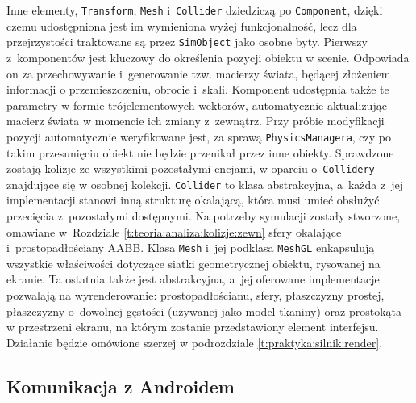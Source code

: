 		Inne elementy, \texttt{Transform}, \texttt{Mesh} i~\texttt{Collider} dziedziczą po \texttt{Component}, dzięki czemu udostępniona jest im wymieniona wyżej funkcjonalność, lecz dla przejrzystości traktowane są przez \texttt{SimObject} jako osobne byty. Pierwszy z~komponentów jest kluczowy do określenia pozycji obiektu w scenie. Odpowiada on za przechowywanie i~generowanie tzw. macierzy świata, będącej złożeniem informacji o przemieszczeniu, obrocie i~skali. Komponent udostępnia także te parametry w formie trójelementowych wektorów, automatycznie aktualizując macierz świata w momencie ich zmiany z~zewnątrz. Przy próbie modyfikacji pozycji automatycznie weryfikowane jest, za sprawą \texttt{PhysicsManagera}, czy po takim przesunięciu obiekt nie będzie przenikał przez inne obiekty. Sprawdzone zostają kolizje ze wszystkimi pozostałymi encjami, w oparciu o~\texttt{Collidery} znajdujące się w osobnej kolekcji. \texttt{Collider} to klasa abstrakcyjna, a~każda z~jej implementacji stanowi inną strukturę okalającą, która musi umieć obsłużyć przecięcia z~pozostałymi dostępnymi. Na potrzeby symulacji zostały stworzone, omawiane w~Rozdziale \ref{t:teoria:analiza:kolizje:zewn} sfery okalające i~prostopadłościany AABB. Klasa \texttt{Mesh} i~jej podklasa \texttt{MeshGL} enkapsulują wszystkie właściwości dotyczące siatki geometrycznej obiektu, rysowanej na ekranie. Ta ostatnia także jest abstrakcyjna, a~jej oferowane implementacje pozwalają na wyrenderowanie: prostopadłościanu, sfery, płaszczyzny prostej, płaszczyzny o~dowolnej gęstości (używanej jako model tkaniny) oraz prostokąta w przestrzeni ekranu, na którym zostanie przedstawiony element interfejsu. Działanie będzie omówione szerzej w podrozdziale \ref{t:praktyka:silnik:render}.
		
		\subsection{Komunikacja z Androidem}
		\label{t:praktyka:silnik:andro}
		
		
